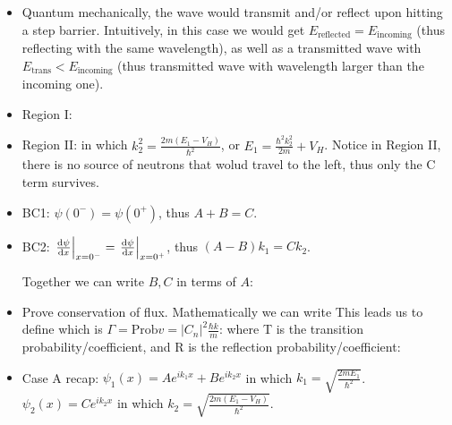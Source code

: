 \documentclass{school-22.101-notes}
\begin{document}
\begin{itemize}
\item Quantum mechanically, the wave would transmit and/or reflect upon hitting a step barrier. Intuitively, in this case we would get $E_{\mathrm{reflected}} = E_{\mathrm{incoming}}$ (thus reflecting with the same wavelength), as well as a transmitted wave with $E_{\mathrm{trans}} < E_{\mathrm{incoming}}$ (thus transmitted wave with wavelength larger than the incoming one). 

\item Region I: 

\item Region II:
in which $k_2^2 = \frac{2m (E_1 - V_H)}{\hbar^2}$, or $E_1  = \frac{\hbar^2 k_2^2}{2m} + V_H$. Notice in Region II, there is no source of neutrons that wolud travel to the left, thus only the C term survives. 

\item BC1: $\psi(0^-) = \psi(0^+)$, thus $A+B = C$. 

\item BC2: $\left. \frac{\mathrm{d}\psi}{\mathrm{d}x} \right|_{x=0^-} = \left. \frac{\mathrm{d}\psi}{\mathrm{d}x} \right|_{x=0^+}$, thus $(A - B) k_1 = C k_2$. 

Together we can write $B, C$ in terms of $A$:

\item Prove conservation of flux. Mathematically we can write 
This leads us to define  which is $\Gamma = \mathrm{Prob} v = |C_n|^2 \frac{\hbar k}{m}$: 
where T is the transition probability/coefficient, and R is the reflection probability/coefficient:

\item Case A recap: 
$\psi_1 (x) = A e^{ik_1 x} + B e^{i k_2 x}$ in which $k_1 = \sqrt{\frac{2 m E_1}{\hbar^2}}$. \\
$\psi_2 (x) = C e^{ik_2 x}$ in which $k_2 = \sqrt{\frac{2 m (E_1 - V_H)}{\hbar^2}}$. 


\end{itemize}
\end{document}
